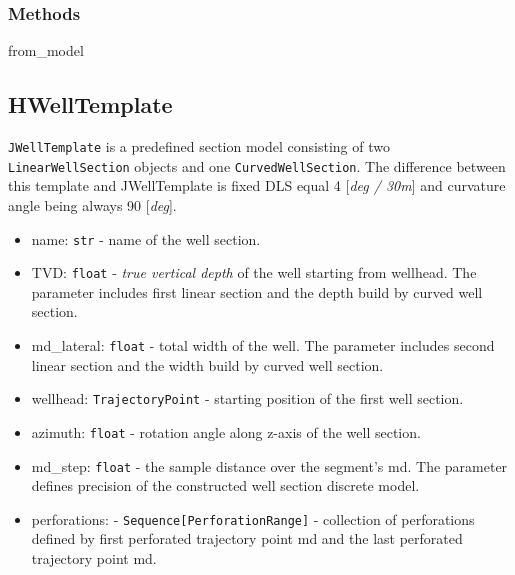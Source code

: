 \documentclass[english,10pt,a4paper]{article}
\begin{document}
\subsubsection{Methods}
\begin{description}
	\item[\colorbox{gray!20}{from\_model}] \hfill
\end{description}

\subsection{HWellTemplate}
\texttt{JWellTemplate} is a predefined section model consisting of two \texttt{LinearWellSection} objects and one \texttt{CurvedWellSection}. The difference between this template and JWellTemplate is fixed DLS equal 4 [\textit{deg / 30m}] and curvature angle being always 90 [\textit{deg}].
\begin{itemize}
	\item  \colorbox{gray!20}{name:} \texttt{str} - name of the well section.
	\item  \colorbox{gray!20}{TVD:} \texttt{float} - \textit{true vertical depth} of the well starting from wellhead. The parameter includes first linear section and the depth build by curved well section.
	\item  \colorbox{gray!20}{md\_lateral:} \texttt{float} - total width of the well. The parameter includes second linear section and the width build by curved well section.
	\item  \colorbox{gray!20}{wellhead:} \texttt{TrajectoryPoint} - starting position of the first well section.
	\item  \colorbox{gray!20}{azimuth:} \texttt{float} - rotation angle along z-axis of the well section.
	\item  \colorbox{gray!20}{md\_step:} \texttt{float} - the sample distance over the segment's md. The parameter defines precision of the constructed well section discrete model.
	\item  \colorbox{gray!20}{perforations:} -  \texttt{Sequence[PerforationRange]} - collection of perforations defined by first perforated trajectory point md and the last perforated trajectory point md.

\end{itemize}
\end{document}
